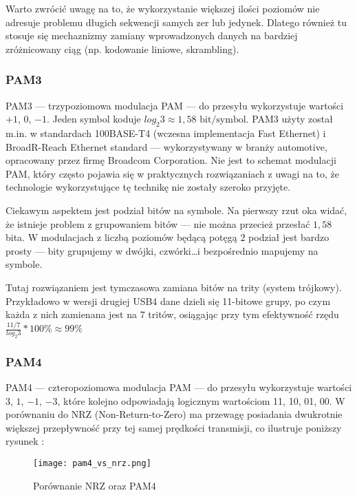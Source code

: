 Warto zwrócić uwagę na to, że wykorzystanie większej ilości poziomów nie adresuje problemu długich sekwencji samych zer lub jedynek. Dlatego również tu
stosuje się mechaznizmy zamiany wprowadzonych danych na bardziej zróżnicowany ciąg (np. kodowanie liniowe, skrambling).

\subsubsection{PAM3}

PAM3 --- trzypoziomowa modulacja PAM --- do przesyłu wykorzystuje wartości $+1$, $0$, $-1$. Jeden symbol koduje $log_{2}{3} \approx 1,58 \text{ bit/symbol}$.
PAM3 użyty został m.in. w standardach 100BASE-T4 (wczesna implementacja Fast Ethernet) i BroadR-Reach Ethernet standard --- wykorzystywany w branży automotive, opracowany przez firmę Broadcom Corporation.
Nie jest to schemat modulacji PAM, który często pojawia się w praktycznych rozwiązaniach z uwagi na to, że technologie wykorzystujące tę technikę nie zostały szeroko przyjęte.

Ciekawym aspektem jest podział bitów na symbole. Na pierwszy rzut oka widać, że istnieje problem z grupowaniem bitów --- nie można przecież przesłać $1,58$ bita. W modulacjach z liczbą poziomów będącą potęgą $2$ podział jest bardzo prosty --- bity grupujemy w dwójki, czwórki\dots i bezpośrednio mapujemy na symbole.

Tutaj rozwiązaniem jest tymczasowa zamiana bitów na trity (system trójkowy). Przykładowo w wersji drugiej USB4 dane dzieli się 11-bitowe grupy, po czym każda z nich zamienana jest na 7 tritów, osiągając przy tym
efektywność rzędu $\frac{11/7}{log_{2}{3}} * 100\% \approx 99\% $


\subsubsection{PAM4}

PAM4 --- czteropoziomowa modulacja PAM --- do przesyłu wykorzystuje wartości $3$, $1$, $-1$, $-3$, które kolejno odpowiadają logicznym wartościom 11, 10, 01, 00. W porównaniu do NRZ (Non-Return-to-Zero) ma przewagę posiadania dwukrotnie większej przepływność przy tej samej prędkości transmisji, co ilustruje poniższy rysunek \cite{Intel-pam4}:

\begin{figure}[ht]
    \centering
    \texttt{[image: pam4\_vs\_nrz.png]}
    \caption{Porównanie NRZ oraz PAM4}
    \label{fig:pam4_vs_nrz}
\end{figure}

